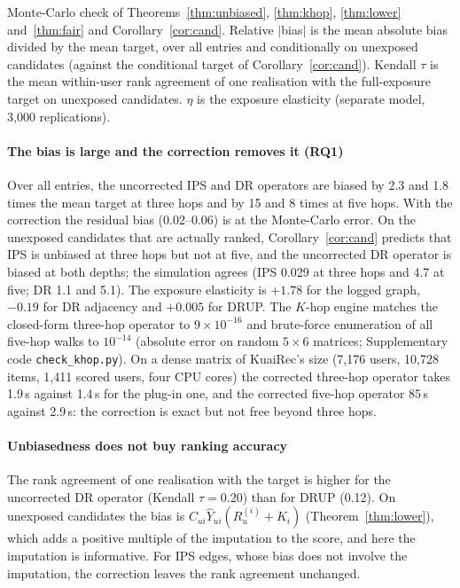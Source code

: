 \documentclass[preprint,review,12pt,authoryear]{elsarticle}
\theoremstyle{definition}
\begin{document}
\begin{table}[t]\centering\small
\caption{Monte-Carlo check of Theorems~\ref{thm:unbiased}, \ref{thm:khop}, \ref{thm:lower}
and~\ref{thm:fair} and Corollary~\ref{cor:cand}. Relative $|$bias$|$ is the mean absolute
bias divided by the mean target, over all entries and conditionally on unexposed
candidates (against the conditional target of Corollary~\ref{cor:cand}). Kendall
$\tau$ is the mean within-user rank agreement of one realisation with the
full-exposure target on unexposed candidates. $\eta$ is the exposure elasticity
(separate model, 3{,}000 replications).}\label{tab:mc}
\begin{adjustbox}{max width=\textwidth}

\end{adjustbox}
\end{table}

\paragraph{The bias is large and the correction removes it (RQ1)} Over all entries, the
uncorrected IPS and DR operators are biased by 2.3 and 1.8 times the mean target
at three hops and by 15 and 8 times at five hops. With the correction the residual
bias (0.02--0.06) is at the Monte-Carlo error. On the unexposed candidates that are
actually ranked, Corollary~\ref{cor:cand} predicts that IPS is unbiased at three
hops but not at five, and the uncorrected DR operator is biased at both depths;
the simulation agrees (IPS 0.029 at three hops and 4.7 at five; DR 1.1 and 5.1).
The exposure elasticity is $+1.78$ for the logged graph, $-0.19$ for DR adjacency
and $+0.005$ for DRUP. The $K$-hop engine matches the closed-form three-hop
operator to $9\times10^{-16}$ and brute-force enumeration of all five-hop walks to
$10^{-14}$ (absolute error on random $5\times6$ matrices; Supplementary code \texttt{check\_khop.py}). On a dense matrix of KuaiRec's size (7{,}176 users, 10{,}728 items, 1{,}411
scored users, four CPU cores) the corrected three-hop operator takes 1.9\,s against
1.4\,s for the plug-in one, and the corrected five-hop operator 85\,s against
2.9\,s: the correction is exact but not free beyond three hops.

\paragraph{Unbiasedness does not buy ranking accuracy} The rank agreement of one
realisation with the target is higher for the uncorrected DR operator (Kendall
$\tau=0.20$) than for DRUP (0.12). On unexposed candidates the bias is
$C_{ui}\hat Y_{ui}(R_u^{(i)}+K_i)$ (Theorem~\ref{thm:lower}), which adds a
positive multiple of the imputation to the score, and here the imputation is
informative. For IPS edges, whose bias does not involve the imputation, the
correction leaves the rank agreement unchanged.
\end{document}
